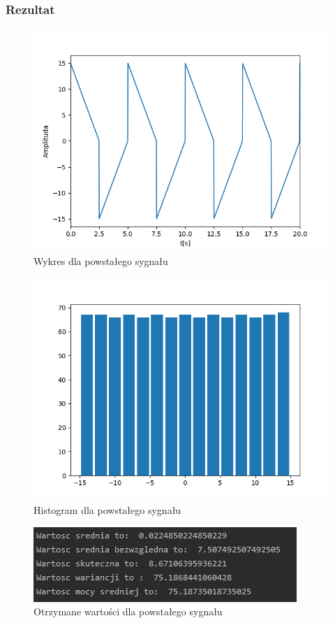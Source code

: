 \documentclass[12pt]{article}
\begin{document}
\subsubsection{Rezultat}
\begin{figure}[H]
\centering
\includegraphics[scale=0.8]{odejmowanieProstTrojkWykres.png}
\caption{Wykres dla powstałego sygnału}
\end{figure}
\begin{figure}[H]
\centering
\includegraphics[scale=0.8]{odejmowanieProstTrojkHist.png}
\caption{Histogram dla powstałego sygnału}
\end{figure}
\begin{figure}[H]
\centering
\includegraphics[scale=0.8]{odejmowanieProstTrojkParam.png}
\caption{Otrzymane wartości dla powstałego sygnału}
\end{figure}
\end{document}
